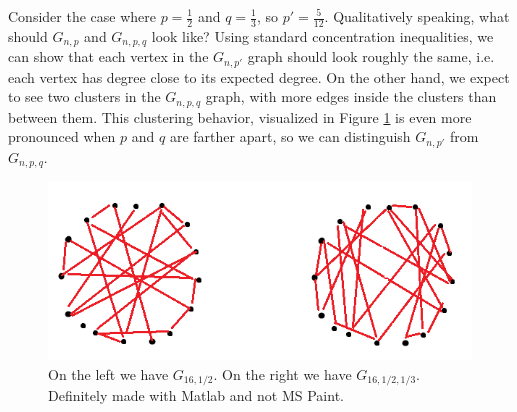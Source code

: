 \documentclass[11pt,letterpaper]{report}
\begin{document}
Consider the case where $p = \frac 12$ and $q = \frac 13$, so $p' = \frac{5}{12}$. Qualitatively speaking, what should $G_{n, p}$ and $G_{n, p, q}$ look like? Using standard concentration inequalities, we can show that each vertex in the $G_{n, p'}$ graph should look roughly the same, i.e. each vertex has degree close to its expected degree. On the other hand, we expect to see two clusters in the $G_{n, p, q}$ graph, with more edges inside the clusters than between them. This clustering behavior, visualized in Figure \ref{fig:graphs} is even more pronounced when $p$ and $q$ are farther apart, so we can distinguish $G_{n, p'}$ from $G_{n, p, q}$.\\

\begin{figure}[ht]
	\centering
    \includegraphics[scale=0.8]{graphs.png}
    \caption{On the left we have $G_{16, 1/2}$. On the right we have $G_{16, 1/2, 1/3}$. Definitely made with Matlab and not MS Paint.}
    \label{fig:graphs}
\end{figure}



\end{document}
